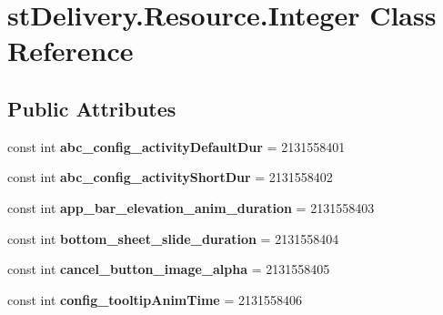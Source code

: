 \hypertarget{classst_delivery_1_1_resource_1_1_integer}{}\section{st\+Delivery.\+Resource.\+Integer Class Reference}
\label{classst_delivery_1_1_resource_1_1_integer}
\subsection*{Public Attributes}
\begin{DoxyCompactItemize}
\item 
\mbox{\label{classst_delivery_1_1_resource_1_1_integer_ae48821820bf388527334c4068137a84c}} 
const int {\bfseries abc\+\_\+config\+\_\+activity\+Default\+Dur} = 2131558401
\item 
\mbox{\label{classst_delivery_1_1_resource_1_1_integer_a2a9c3b01a4c0e2855505dd7d981f0a3e}} 
const int {\bfseries abc\+\_\+config\+\_\+activity\+Short\+Dur} = 2131558402
\item 
\mbox{\label{classst_delivery_1_1_resource_1_1_integer_a5d92effaa936bbedd3fab7c9fadd2d22}} 
const int {\bfseries app\+\_\+bar\+\_\+elevation\+\_\+anim\+\_\+duration} = 2131558403
\item 
\mbox{\label{classst_delivery_1_1_resource_1_1_integer_a9bfd7854a6dcd6a9cba1cdd4ee21514d}} 
const int {\bfseries bottom\+\_\+sheet\+\_\+slide\+\_\+duration} = 2131558404
\item 
\mbox{\label{classst_delivery_1_1_resource_1_1_integer_a7a1a623a201abaa5bbe66a3da55d37af}} 
const int {\bfseries cancel\+\_\+button\+\_\+image\+\_\+alpha} = 2131558405
\item 
\mbox{\label{classst_delivery_1_1_resource_1_1_integer_ae9b719e5b1d7406dc6dc27481579f97e}} 
const int {\bfseries config\+\_\+tooltip\+Anim\+Time} = 2131558406
\item 
\mbox{\label{classst_delivery_1_1_resource_1_1_integer_a2fb5184d1240ebe8ede9c10494f3f057}} 

\end{DoxyCompactItemize}
